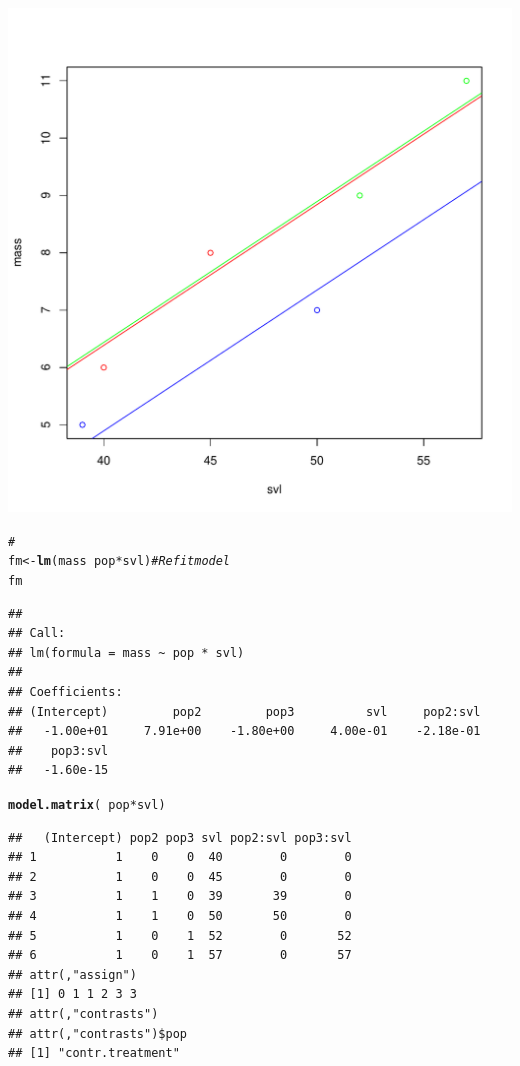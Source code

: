 \documentclass{article}\usepackage[]{graphicx}\usepackage[]{color}
\makeatletter
\def\maxwidth{ %
  \ifdim\Gin@nat@width>\linewidth
    \linewidth
  \else
    \Gin@nat@width
  \fi
}
\newcommand{\hlcom}[1]{\textcolor[rgb]{0.678,0.584,0.686}{\textit{#1}}}%
\newcommand{\hlopt}[1]{\textcolor[rgb]{0,0,0}{#1}}%
\newcommand{\hlstd}[1]{\textcolor[rgb]{0.345,0.345,0.345}{#1}}%
\newcommand{\hlkwb}[1]{\textcolor[rgb]{0.69,0.353,0.396}{#1}}%
\newcommand{\hlkwd}[1]{\textcolor[rgb]{0.737,0.353,0.396}{\textbf{#1}}}%
\newenvironment{kframe}{%
 \def\at@end@of@kframe{}%
 \ifinner\ifhmode%
  \def\at@end@of@kframe{\end{minipage}}%
  \begin{minipage}{\columnwidth}%
 \fi\fi%
 \def\FrameCommand##1{\hskip\@totalleftmargin \hskip-\fboxsep
 \colorbox{shadecolor}{##1}\hskip-\fboxsep
     \hskip-\linewidth \hskip-\@totalleftmargin \hskip\columnwidth}%
 \MakeFramed {\advance\hsize-\width
   \@totalleftmargin\z@ \linewidth\hsize
   \@setminipage}}%
 {\par\unskip\endMakeFramed%
 \at@end@of@kframe}
\newenvironment{knitrout}{}{} %
\makeatother
\begin{document}
\begin{knitrout}
\includegraphics[width=\maxwidth]{figure/unnamed-chunk-111} 
\begin{kframe}\begin{alltt}
\hlcom{# }
\hlstd{fm} \hlkwb{<-} \hlkwd{lm}\hlstd{(mass} \hlopt{~} \hlstd{pop} \hlopt{*} \hlstd{svl)}  \hlcom{# Refit model}
\hlstd{fm}
\end{alltt}
\begin{verbatim}
## 
## Call:
## lm(formula = mass ~ pop * svl)
## 
## Coefficients:
## (Intercept)         pop2         pop3          svl     pop2:svl  
##   -1.00e+01     7.91e+00    -1.80e+00     4.00e-01    -2.18e-01  
##    pop3:svl  
##   -1.60e-15
\end{verbatim}
\begin{alltt}
\hlkwd{model.matrix}\hlstd{(}\hlopt{~}\hlstd{pop} \hlopt{*} \hlstd{svl)}
\end{alltt}
\begin{verbatim}
##   (Intercept) pop2 pop3 svl pop2:svl pop3:svl
## 1           1    0    0  40        0        0
## 2           1    0    0  45        0        0
## 3           1    1    0  39       39        0
## 4           1    1    0  50       50        0
## 5           1    0    1  52        0       52
## 6           1    0    1  57        0       57
## attr(,"assign")
## [1] 0 1 1 2 3 3
## attr(,"contrasts")
## attr(,"contrasts")$pop
## [1] "contr.treatment"

\end{verbatim}
\end{kframe}
\end{knitrout}
\end{document}

